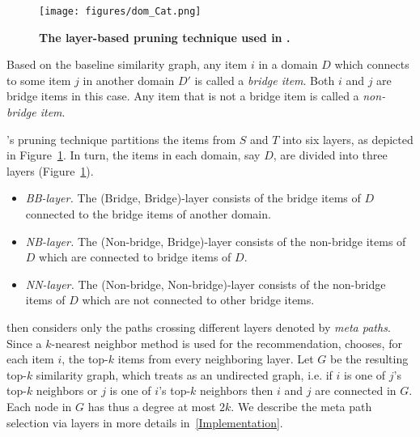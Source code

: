 \begin{figure}
\begin{center}
\texttt{[image: figures/dom\_Cat.png]}
\vspace{-2mm}
\caption{{\bf The layer-based pruning technique used in \crossrec.}}
\label{fig:domcat}
\end{center}
\end{figure}

 Based on the baseline similarity graph, any item $i$ in a domain $D$ which connects to some item $j$ in another domain $D'$ is called a \emph{bridge item}. Both $i$ and $j$ are bridge items in this case. Any item that is not a bridge item is called a \emph{non-bridge item}. 

\crossrec's pruning technique partitions the items from $S$ and $T$ into six layers, as depicted in Figure~\ref{fig:domcat}. In turn, the items in each domain, say $D$, are divided into three layers (Figure~\ref{fig:domcat}).

\begin{itemize}
\item {\it BB-layer.} The (Bridge, Bridge)-layer consists of the bridge items of $D$ connected to the bridge items of another domain.

\item {\it NB-layer.} The (Non-bridge, Bridge)-layer consists of the non-bridge items of $D$ which are connected to bridge items of $D$.

\item {\it NN-layer.} The (Non-bridge, Non-bridge)-layer consists of the non-bridge items of $D$ which are not connected to other bridge items.
\end{itemize}

\crossrec then considers only the paths crossing different layers denoted by \emph{meta paths}.  Since a $k$-nearest neighbor method is used for the recommendation, \crossrec chooses, for each item $i$, the top-$k$ items from every neighboring layer. Let $G$ be the resulting top-$k$ similarity graph, which \crossrec treats as an undirected graph, i.e. if $i$ is one of $j$'s top-$k$ neighbors or $j$ is one of $i$'s top-$k$ neighbors then $i$ and $j$ are connected in $G$. Each node in $G$ has thus a degree at most $2k$. We describe the meta path selection via layers in more details in~\autoref{Implementation}.


